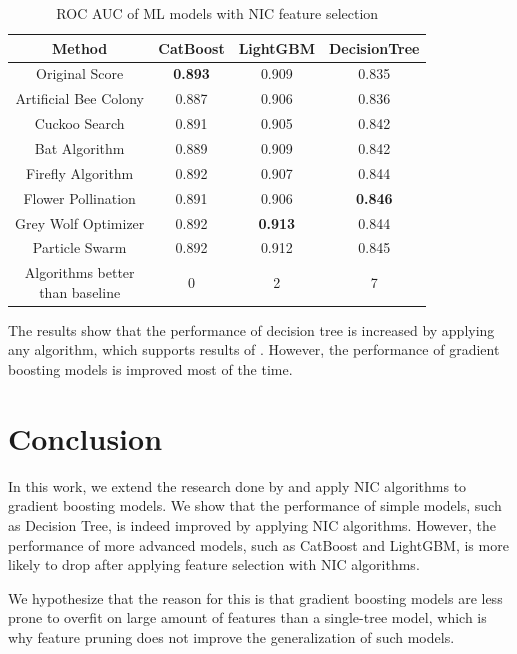 \documentclass[conference]{IEEEtran}
\begin{document}
\begin{table}[H]
	\centering
	\caption{ROC AUC of ML models with NIC feature selection}
	\label{tab:results}
	\begin{tabular}{c c c c}
		\hline
		Method                & CatBoost       & LightGBM       & DecisionTree   \\
		\hline
		Original Score        & \textbf{0.893} & 0.909          & 0.835          \\
		Artificial Bee Colony & 0.887          & 0.906          & 0.836          \\
		Cuckoo Search         & 0.891          & 0.905          & 0.842          \\
		Bat Algorithm         & 0.889          & 0.909          & 0.842          \\
		Firefly Algorithm     & 0.892          & 0.907          & 0.844          \\
		Flower Pollination    & 0.891          & 0.906          & \textbf{0.846} \\
		Grey Wolf Optimizer   & 0.892          & \textbf{0.913} & 0.844          \\
		Particle Swarm        & 0.892          & 0.912          & 0.845          \\
		\hline
		\makecell{Algorithms better                                              \\
		than baseline}        & 0              & 2              & 7              \\
		\hline
	\end{tabular}
\end{table}

The results show that the performance of decision tree
is increased by applying any algorithm, which supports
results of \cite{github}. However, the performance of gradient
boosting models is improved most of the time.

\section{Conclusion}
In this work, we extend the research done by \cite{github} and
apply NIC algorithms to gradient boosting models. We show that
the performance of simple models, such as Decision Tree, is indeed
improved by applying NIC algorithms. However, the performance
of more advanced models, such as CatBoost and LightGBM, is more
likely to drop after applying feature selection with NIC algorithms.

We hypothesize that the reason for this is that gradient boosting
models are less prone to overfit on large amount of features than
a single-tree model, which is why feature pruning does not
improve the generalization of such models.
\end{document}
